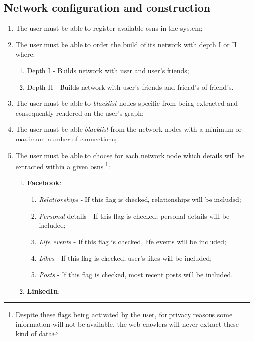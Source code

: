 \subsection{Network configuration and construction}

\begin{enumerate}
    \item The user must be able to register available \glspl{osn} in the system;
    \item The user must be able to order the build of its network with depth I or II where:
    \begin{enumerate}
        \item Depth I - Builds network with user and user's friends;
        \item Depth II - Builds network with user's friends and friend's of friend's.
    \end{enumerate}
    \item The user must be able to \textit{blacklist} nodes specific from being extracted and consequently rendered on the user's graph;
    \item The user must be able \textit{blacklist} from the network nodes with a minimum or maximum number of connections;
    \item The user must be able to choose for each network node which details will be extracted within a given \glspl{osn} \footnote{Despite these flags being activated by the user, for privacy reasons some information will not be available, the web crawlers will never extract these kind of data}:
    \begin{enumerate}
        \item \textbf{Facebook}:
        \begin{enumerate}
            \item \textit{Relationships} - If this flag is checked, relationships will be included;
            \item \textit{Personal} details - If this flag is checked, personal details will be included;
            \item \textit{Life events} - If this flag is checked, life events will be included;
            \item \textit{Likes} - If this flag is checked, user's likes will be included;
            \item \textit{Posts} - If this flag is checked, most recent posts will be included.
        \end{enumerate}
        \item \textbf{LinkedIn}:

\end{enumerate}
\end{enumerate}
